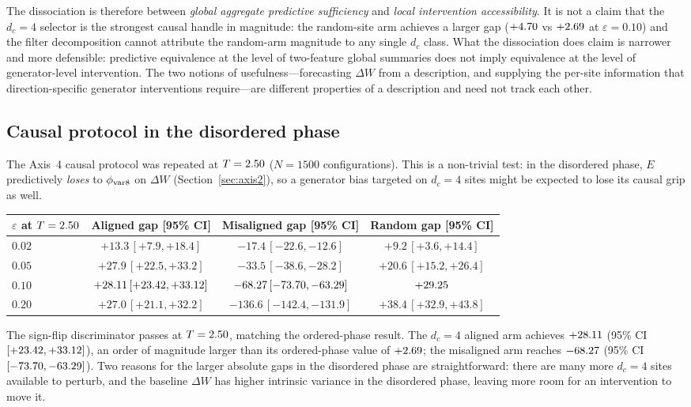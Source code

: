 \documentclass[aps,pre,preprint,superscriptaddress,showpacs]{revtex4-2}
\begin{document}
The dissociation is therefore between
\emph{global aggregate predictive sufficiency} and
\emph{local intervention accessibility}.
It is not a claim that the $d_c=4$ selector is the strongest causal
handle in magnitude: the random-site arm achieves a larger gap
($+4.70$ vs $+2.69$ at $\varepsilon=0.10$) and the
filter decomposition cannot attribute the random-arm magnitude to any
single $d_c$ class.
What the dissociation does claim is narrower and more defensible:
predictive equivalence at the level of two-feature global summaries
does not imply equivalence at the level of generator-level
intervention.
The two notions of usefulness---forecasting $\Delta W$ from a
description, and supplying the per-site information that
direction-specific generator interventions require---are different
properties of a description and need not track each other.

\subsection{Causal protocol in the disordered phase}
\label{sec:causal_dis}

The Axis~4 causal protocol was repeated at $T=2.50$ ($N=1500$
configurations).
This is a non-trivial test: in the disordered phase, $E$ predictively
\emph{loses} to $\phi_{\rm var8}$ on $\Delta W$ (Section~\ref{sec:axis2}),
so a generator bias targeted on $d_c=4$ sites might be expected to lose
its causal grip as well.
\begin{center}
\begin{tabular}{lccc}
\toprule
$\varepsilon$ at $T=2.50$ & Aligned gap [95\% CI] & Misaligned gap [95\% CI] & Random gap [95\% CI] \\
\midrule
$0.02$ & $+13.3\,[+7.9,+18.4]$  & $-17.4\,[-22.6,-12.6]$ & $+9.2\,[+3.6,+14.4]$  \\
$0.05$ & $+27.9\,[+22.5,+33.2]$  & $-33.5\,[-38.6,-28.2]$ & $+20.6\,[+15.2,+26.4]$ \\
$0.10$ & $+28.11\,[+23.42,+33.12]$  & $-68.27\,[-73.70,-63.29]$ & $+29.25$ \\
$0.20$ & $+27.0\,[+21.1,+32.2]$  & $-136.6\,[-142.4,-131.9]$ & $+38.4\,[+32.9,+43.8]$ \\
\bottomrule
\end{tabular}
\end{center}
The sign-flip discriminator passes \CausalDisSignFlips{} at $T=2.50$,
matching the ordered-phase result.
The $d_c=4$ aligned arm achieves $+28.11$ (95\% CI
$[+23.42,+33.12]$), an order of
magnitude larger than its ordered-phase value of $+2.69$;
the misaligned arm reaches $-68.27$ (95\% CI
$[-73.70,-63.29]$).
Two reasons for the larger absolute gaps in the disordered phase are
straightforward: there are many more $d_c=4$ sites available to perturb,
and the baseline $\Delta W$ has higher intrinsic variance in the
disordered phase, leaving more room for an intervention to move it.
\end{document}
